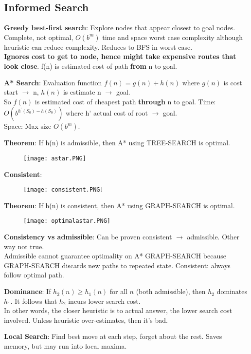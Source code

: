 \documentclass[a4paper,landscape]{article}
\newcommand{\rntopic}[1]{\vspace{-2.0em}\subsection*{#1}\vspace{-1.0em}}
\newcommand{\rnname}[1]{\textbf{#1}}
\begin{document}
\begin{multicols*}{4}
\vspace{-0.3cm}
\begin{flatitemize}
\rntopic{Informed Search}
\item \rnname{Greedy best-first search}: Explore nodes that appear closest to goal nodes. \\
Complete, not optimal, $O(b^m)$ time and space worst case complexity although heuristic can reduce complexity. Reduces to BFS in worst case. \\
\textbf{Ignores cost to get to node, hence might take expensive routes that look close}. f(n) is estimated cost of path \textbf{from} n to goal.
\item \rnname{A* Search}: Evaluation function $f(n) = g(n) + h(n)$ where $g(n)$ is cost start $\rightarrow$ n, $h(n)$ is estimate n $\rightarrow$ goal.\\
So $f(n)$ is estimated cost of cheapest path \textbf{through} n to goal. 
Time: $O(b^{h^{'}(S_0) - h(S_0)})$ where h' actual cost of root $\rightarrow$ goal.\\
Space: Max size $O(b^m)$.
\item \rnname{Theorem}: If h(n) is admissible, then A* using TREE-SEARCH is optimal.
\vspace{-0.5cm}
    \begin{figure}[H]
      \texttt{[image: astar.PNG]}
    \end{figure}
\vspace{-0.4cm}
\item \rnname{Consistent}:
\vspace{-0.5cm}
    \begin{figure}[H]
      \texttt{[image: consistent.PNG]}
    \end{figure}
\vspace{-0.4cm}
\item \rnname{Theorem}: If h(n) is consistent, then A* using GRAPH-SEARCH is optimal.
\vspace{-0.5cm}
    \begin{figure}[H]
      \texttt{[image: optimalastar.PNG]}
    \end{figure}
\vspace{-0.4cm}
\item \rnname{Consistency vs admissible}: Can be proven consistent $\rightarrow$ admissible. Other way not true. \\
Admissible cannot guarantee optimality on A* GRAPH-SEARCH because GRAPH-SEARCH discards new paths to repeated state. Consistent: always follow optimal path. 
\item \rnname{Dominance}: If $h_2(n) \geq h_1(n)$ for all $n$ (both admissible), then $h_2$ dominates $h_1$. It follows that $h_2$ incurs lower search cost.\\
In other words, the closer heuristic is to actual answer, the lower search cost involved. Unless heuristic over-estimates, then it's bad.
\item \rnname{Local Search}: Find best move at each step, forget about the rest. Saves memory, but may run into local maxima.


\end{flatitemize}
\end{multicols*}
\end{document}
